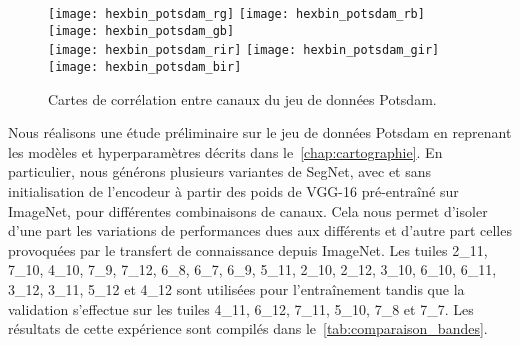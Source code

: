 \begin{figure}[h]
  \texttt{[image: hexbin\_potsdam\_rg]}
  \texttt{[image: hexbin\_potsdam\_rb]}
  \texttt{[image: hexbin\_potsdam\_gb]}\\
  \texttt{[image: hexbin\_potsdam\_rir]}
  \texttt{[image: hexbin\_potsdam\_gir]}
  \texttt{[image: hexbin\_potsdam\_bir]}
  \caption{Cartes de corrélation entre canaux du jeu de données  Potsdam.}
  \label{fig:potsdam_correlations}
\end{figure}

Nous réalisons une étude préliminaire sur le jeu de données  Potsdam en reprenant les modèles et hyperparamètres décrits dans le~\cref{chap:cartographie}. En particulier, nous générons plusieurs variantes de SegNet, avec et sans initialisation de l'encodeur à partir des poids de VGG-16 pré-entraîné sur ImageNet, pour différentes combinaisons de canaux. Cela nous permet d'isoler d'une part les variations de performances dues aux différents et d'autre part celles provoquées par le transfert de connaissance depuis ImageNet. Les tuiles 2\_11, 7\_10, 4\_10, 7\_9, 7\_12, 6\_8, 6\_7, 6\_9, 5\_11, 2\_10, 2\_12, 3\_10, 6\_10, 6\_11, 3\_12, 3\_11, 5\_12 et 4\_12 sont utilisées pour l'entraînement tandis que la validation s'effectue sur les tuiles 4\_11, 6\_12, 7\_11, 5\_10, 7\_8 et 7\_7. Les résultats de cette expérience sont compilés dans le~\cref{tab:comparaison_bandes}.

